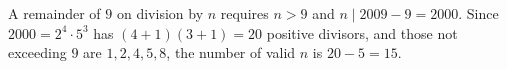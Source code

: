 A remainder of $9$ on division by $n$ requires $n>9$ and $n\mid 2009-9=2000$. Since $2000=2^4\cdot5^3$ has $(4+1)(3+1)=20$ positive divisors, and those not exceeding $9$ are $1,2,4,5,8$, the number of valid $n$ is $20-5=\boxed{15}$.
